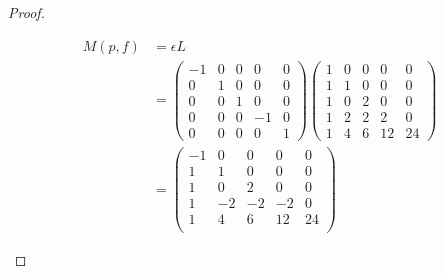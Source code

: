 \documentclass[12pt]{extarticle}
\newcommand{\<}{\langle}
\renewcommand{\>}{\rangle}
\theoremstyle{definition}
\begin{document}
\begin{proof}
\begin{enumerate}
    \begin{align*}
      M(p,f)
      &= 
      \epsilon L \\
      &=
      \begin{pmatrix}
        -1 & 0 & 0 & 0 & 0 \\
        0 & 1 & 0 & 0 & 0 \\
        0 & 0 & 1 & 0 & 0 \\
        0 & 0 & 0 & -1 & 0 \\
        0 & 0 & 0 & 0 & 1
      \end{pmatrix} 
      \begin{pmatrix}
        1 & 0 & 0 & 0 & 0 \\
        1 & 1 & 0 & 0 & 0 \\
        1 & 0 & 2 & 0 & 0 \\
        1 & 2 & 2 & 2 & 0 \\
        1 & 4 & 6 & 12 & 24
      \end{pmatrix}
      \\
      &=
      \begin{pmatrix}
        -1 & 0 &  0 &  0 &  0 \\
        1  & 1  & 0  & 0  & 0 \\
        1  & 0  & 2  & 0  & 0 \\
        1  &-2  &-2  &-2  & 0 \\
        1  & 4  & 6  &12  &24 \\
      \end{pmatrix}
    \end{align*}


\end{enumerate}
\end{proof}
\end{document}
